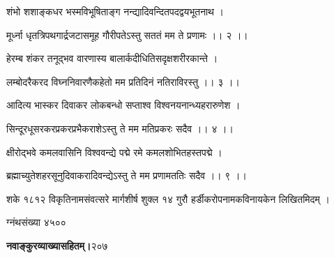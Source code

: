 \documentclass[11pt, openany]{book}
\begin{document}
\begin{sloppypar}
\hangindent=0.2in \hspace{0.2in}शंभो शशाङ्कधर भस्मविभूषिताङ्ग नन्द्यादिवन्दितपदद्वयभूतनाथ । 

\hangindent=0.2in \hspace{0.2in}मूर्ध्ना धृतत्रिपथगार्द्रजटासमूह गौरीपतेऽस्तु सततं मम ते प्रणामः ।। २ ।। 

\hangindent=0.2in \hspace{0.2in}हेरम्ब शंकर तनूद्भव वारणास्य बालार्कदीधितिसदृक्षशरीरकान्ते । 

\hangindent=0.2in \hspace{0.2in}लम्बोदरैकरद विघ्ननिवारणैकहेतो मम प्रतिदिनं नतिराविरस्तु ।। ३ ।। 

\hangindent=0.2in \hspace{0.2in}आदित्य भास्कर दिवाकर लोकबन्धो सप्ताश्व विश्वनयनान्ध्यहरारुणेश । 

\hangindent=0.2in \hspace{0.2in}सिन्दूरधूसरकरप्रकरप्रभैकराशेऽस्तु ते मम मतिप्रकरः सदैव ।। ४ ।। 

\hangindent=0.2in \hspace{0.2in}क्षीरोद्भवे कमलवासिनि विश्ववन्द्ये पद्मे रमे कमलशोभितहस्तपद्मे । 

\hangindent=0.2in \hspace{0.2in}ब्रह्माच्युतेशहरसूनुदिवाकरादिवन्द्येऽस्तु ते मम प्रणामततिः सदैव ।। ९ ।। 

\hangindent=0.2in \hspace{0.2in}शके १८१२ विकृतिनामसंवत्सरे मार्गशीर्ष शुक्ल १४ गुरौ हर्डीकरोपनामकविनायकेन लिखितमिदम् । 

\begin{center}ग्नंथसंख्या ४५००\end{center}
\end{sloppypar}
\thispagestyle{empty}
\newpage

\onehalfspacing
\hspace{2in}\textbf{नवाङ्कुरव्याख्यासहितम्।}\hspace{2in}२०७ 
\end{document}
